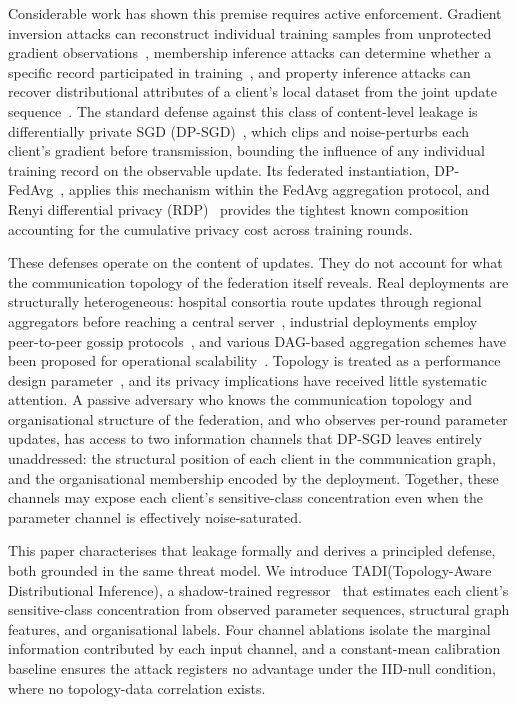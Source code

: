 \documentclass[letterpaper,journal]{IEEEtran}
\newcommand{\TADI}{\textsc{TADI}\xspace}
\begin{document}
Considerable work has shown this premise requires active enforcement.
Gradient inversion attacks can reconstruct individual training samples
from unprotected gradient observations~\cite{zhu2019dlg,geiping2020inverting},
membership inference attacks can determine whether a specific record
participated in training~\cite{shokri2017membership}, and property
inference attacks can recover distributional attributes of a client's
local dataset from the joint update sequence~\cite{melis2019exploiting}.
The standard defense against this class of content-level leakage is
differentially private SGD (DP-SGD)~\cite{abadi2016dpsgd}, which
clips and noise-perturbs each client's gradient before transmission,
bounding the influence of any individual training record on the
observable update. Its federated instantiation, DP-FedAvg~\cite{mcmahan2018dpfedavg},
applies this mechanism within the FedAvg aggregation protocol, and
Renyi differential privacy (RDP)~\cite{mironov2017rdp} provides the
tightest known composition accounting for the cumulative privacy cost
across training rounds.

These defenses operate on the content of updates. They do not account
for what the communication topology of the federation itself reveals.
Real deployments are structurally heterogeneous: hospital consortia
route updates through regional aggregators before reaching a central
server~\cite{liu2020hierarchical,abad2020icassp}, industrial
deployments employ peer-to-peer gossip
protocols~\cite{roy2019braintorrent,hegedus2021decentralized}, and
various DAG-based aggregation schemes have been proposed for
operational scalability~\cite{beilharz2021dag}. Topology is treated
as a performance design parameter~\cite{wang2021fieldguide}, and its
privacy implications have received little systematic attention. A
passive adversary who knows the communication topology and
organisational structure of the federation, and who observes
per-round parameter updates, has access to two information channels
that DP-SGD leaves entirely unaddressed: the structural position of
each client in the communication graph, and the organisational
membership encoded by the deployment. Together, these channels may expose each client's sensitive-class concentration even when the parameter channel is effectively noise-saturated.

This paper characterises that leakage formally and derives a
principled defense, both grounded in the same threat model. We introduce \TADI (Topology-Aware Distributional Inference), a shadow-trained regressor~\cite{shokri2017membership} that estimates each client's sensitive-class concentration from observed parameter
sequences, structural graph features, and organisational labels. Four
channel ablations isolate the marginal information contributed by each
input channel, and a constant-mean calibration baseline ensures the
attack registers no advantage under the IID-null condition, where no
topology-data correlation exists.
\end{document}
